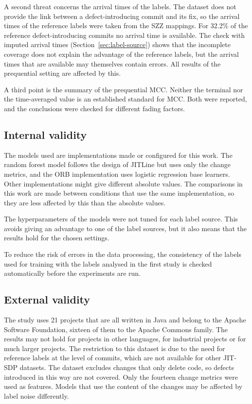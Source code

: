 \documentclass[12pt,a4paper,oneside]{report}
\begin{document}
A second threat concerns the arrival times of the labels. The dataset does
not provide the link between a defect-introducing commit and its fix, so the
arrival times of the reference labels were taken from the SZZ mappings. For
32.2\% of the reference defect-introducing commits no arrival time is
available. The check with imputed arrival times
(Section~\ref{sec:label-source}) shows that the incomplete coverage does not
explain the advantage of the reference labels, but the arrival times that are
available may themselves contain errors. All results of the prequential
setting are affected by this.

A third point is the summary of the prequential MCC. Neither the terminal
nor the time-averaged value is an established standard for MCC. Both were
reported, and the conclusions were checked for different fading factors.

\subsection{Internal validity}

The models used are implementations made or configured for this work. The
random forest model follows the design of JITLine but uses only the change
metrics, and the ORB implementation uses logistic regression base learners.
Other implementations might give different absolute values. The comparisons
in this work are made between conditions that use the same implementation,
so they are less affected by this than the absolute values.

The hyperparameters of the models were not tuned for each label source. This
avoids giving an advantage to one of the label sources, but it also means
that the results hold for the chosen settings.

To reduce the risk of errors in the data processing, the consistency of the
labels used for training with the labels analysed in the first study is
checked automatically before the experiments are run.

\subsection{External validity}

The study uses 21 projects that are all written in Java and belong to the
Apache Software Foundation, sixteen of them to the Apache Commons family.
The results may not hold for projects in other languages, for industrial
projects or for much larger projects. The restriction to this dataset is due
to the need for reference labels at the level of commits, which are not
available for other JIT-SDP datasets. The dataset excludes changes that only
delete code, so defects introduced in this way are not covered. Only the
fourteen change metrics were used as features. Models that use the content of
the changes may be affected by label noise differently.
\end{document}
